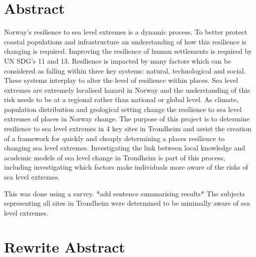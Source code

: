 

\section{Abstract}

Norway’s resilience to sea level extremes is a dynamic process. To better protect coastal populations and infrastructure an understanding of how this resilience is changing is required. Improving the resilience of human settlements is required by UN SDG's 11 and 13. Resilience is impacted by many factors which can be considered as falling within three key systems:  natural, technological and social. These systems interplay to alter the level of resilience within places. Sea level extremes are extremely localised hazard in Norway and the understanding of this risk needs to be at a regional rather than national or global level. As climate, population distribution and geological setting change the resilience to sea level extremes of places in Norway change. The purpose of this project is to determine resilience to sea level extremes in 4 key sites in Trondheim and assist the creation of a framework for quickly and cheaply determining a places resilience to changing sea level extremes. Investigating the link between local knowledge and academic models of sea level change in Trondheim is part of this process, including investigating which factors make individuals more aware of the risks of sea level extremes. 

This was done using a survey. *add sentence summarising results*
The subjects representing all sites in Trondheim were determined to be minimally aware of sea level extremes. 

\newpage

\section{Rewrite Abstract}

